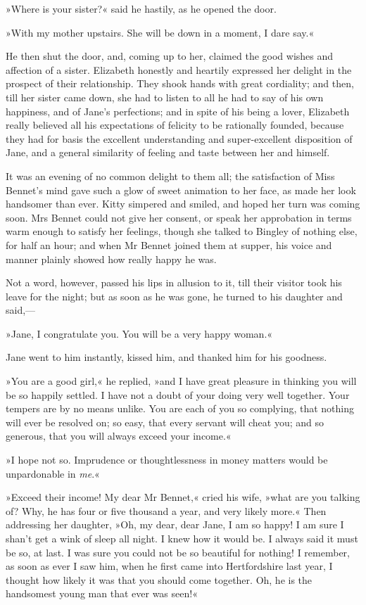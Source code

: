 »Where is your sister?« said he hastily, as he opened the door.

»With my mother upstairs. She will be down in a moment, I dare say.«

He then shut the door, and, coming up to her, claimed the good wishes and affection of a sister. Elizabeth honestly and heartily expressed her delight in the prospect of their relationship. They shook hands with great cordiality; and then, till her sister came down, she had to listen to all he had to say of his own happiness, and of Jane's perfections; and in spite of his being a lover, Elizabeth really believed all his expectations of felicity to be rationally founded, because they had for basis the excellent understanding and super-excellent disposition of Jane, and a general similarity of feeling and taste between her and himself.

It was an evening of no common delight to them all; the satisfaction of Miss Bennet's mind gave such a glow of sweet animation to her face, as made her look handsomer than ever. Kitty simpered and smiled, and hoped her turn was coming soon. Mrs Bennet could not give her consent, or speak her approbation in terms warm enough to satisfy her feelings, though she talked to Bingley of nothing else, for half an hour; and when Mr Bennet joined them at supper, his voice and manner plainly showed how really happy he was.

Not a word, however, passed his lips in allusion to it, till their visitor took his leave for the night; but as soon as he was gone, he turned to his daughter and said,—

»Jane, I congratulate you. You will be a very happy woman.«

Jane went to him instantly, kissed him, and thanked him for his goodness.

»You are a good girl,« he replied, »and I have great pleasure in thinking you will be so happily settled. I have not a doubt of your doing very well together. Your tempers are by no means unlike. You are each of you so complying, that nothing will ever be resolved on; so easy, that every servant will cheat you; and so generous, that you will always exceed your income.«

»I hope not so. Imprudence or thoughtlessness in money matters would be unpardonable in \textit{me}.«

»Exceed their income! My dear Mr Bennet,« cried his wife, »what are you talking of? Why, he has four or five thousand a year, and very likely more.« Then addressing her daughter, »Oh, my dear, dear Jane, I am so happy! I am sure I shan't get a wink of sleep all night. I knew how it would be. I always said it must be so, at last. I was sure you could not be so beautiful for nothing! I remember, as soon as ever I saw him, when he first came into Hertfordshire last year, I thought how likely it was that you should come together. Oh, he is the handsomest young man that ever was seen!«

